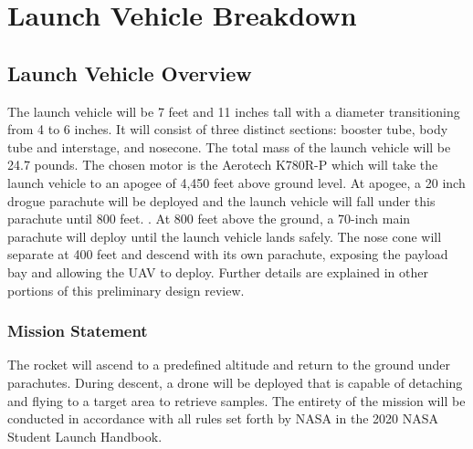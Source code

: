 \chapter{Launch Vehicle Breakdown}

\section{Launch Vehicle Overview}
The launch vehicle will be 7 feet and 11 inches tall with a diameter transitioning from 4 to 6 inches. It will consist of three distinct sections: booster tube, body tube and interstage, and nosecone. The total mass of the launch vehicle will be 24.7 pounds. The chosen motor is the Aerotech K780R-P which will take the launch vehicle to an apogee of 4,450 feet above ground level. At apogee, a 20 inch drogue parachute will be deployed and the launch vehicle will fall under this parachute until 800 feet. . At 800 feet above the ground, a 70-inch main parachute will deploy until the launch vehicle lands safely. The nose cone will separate at 400 feet and descend with its own parachute, exposing the payload bay and allowing the UAV to deploy. Further details are explained in other portions of this preliminary design review.

    \subsection{Mission Statement}
The rocket will ascend to a predefined altitude and return to the ground under parachutes. During descent, a drone will be deployed that is capable of detaching and flying to a target area to retrieve samples. The entirety of the mission will be conducted in accordance with all rules set forth by NASA in the 2020 NASA Student Launch Handbook.
    
